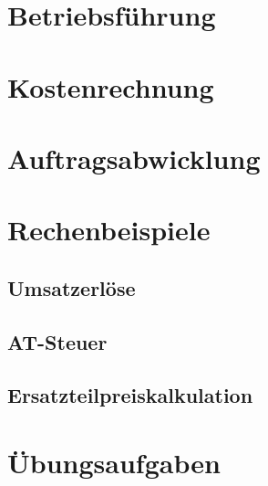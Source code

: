 


\chapter{Betriebsführung}

\chapter{Kostenrechnung}

\chapter{Auftragsabwicklung}





\chapter{Rechenbeispiele}%

\section{Umsatzerlöse}\label{sec:01-Umsatzerloese}

\section{AT-Steuer}\label{sec:02-AT-Steuer}

\section{Ersatzteilpreiskalkulation}\label{sec:03-Ersatzteilpreiskalkulation}





\chapter{Übungsaufgaben}

